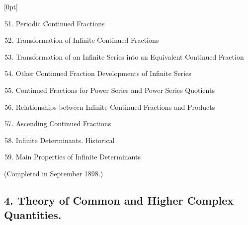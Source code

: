 
\thispagestyle{fancy}

\vspace{0.5cm}


[0pt]
  {}
  {\numberline{}\makebox[1.5cm][l]{\thesubsection}}
  {}
  {\contentspage}

\fontsize{6}{0}\selectfont 
\bfseries 

\begin{enumerate}[itemsep=0pt]
    \setcounter{enumi}{50}
    \item Periodic Continued Fractions
    \item Transformation of Infinite Continued Fractions
    \item Transformation of an Infinite Series into an Equivalent Continued Fraction
    \item Other Continued Fraction Developments of Infinite Series
    \item Continued Fractions for Power Series and Power Series Quotients
    \item Relationships between Infinite Continued Fractions and Products
    \item Ascending Continued Fractions
    \item Infinite Determinants. Historical
    \item Main Properties of Infinite Determinants
\end{enumerate}

\vspace{-0.1cm}
{\normalfont(Completed in September 1898.)}

\subsection*{\small4. Theory of Common and Higher Complex Quantities. \newline {}}

